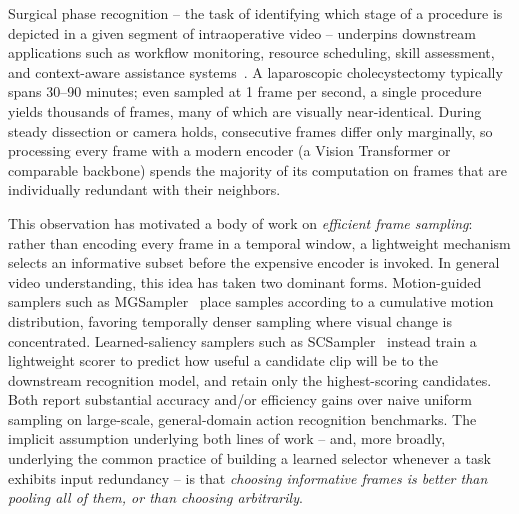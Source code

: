 \documentclass[preprint,12pt]{elsarticle}
\begin{document}
Surgical phase recognition -- the task of identifying which stage of a procedure is depicted in a given segment of intraoperative video -- underpins downstream applications such as workflow monitoring, resource scheduling, skill assessment, and context-aware assistance systems~\cite{czempiel2020tecno}. A laparoscopic cholecystectomy typically spans 30--90 minutes; even sampled at 1 frame per second, a single procedure yields thousands of frames, many of which are visually near-identical. During steady dissection or camera holds, consecutive frames differ only marginally, so processing every frame with a modern encoder (a Vision Transformer or comparable backbone) spends the majority of its computation on frames that are individually redundant with their neighbors.

This observation has motivated a body of work on \emph{efficient frame sampling}: rather than encoding every frame in a temporal window, a lightweight mechanism selects an informative subset before the expensive encoder is invoked. In general video understanding, this idea has taken two dominant forms. Motion-guided samplers such as MGSampler~\cite{zhi2021mgsampler} place samples according to a cumulative motion distribution, favoring temporally denser sampling where visual change is concentrated. Learned-saliency samplers such as SCSampler~\cite{korbar2019scsampler} instead train a lightweight scorer to predict how useful a candidate clip will be to the downstream recognition model, and retain only the highest-scoring candidates. Both report substantial accuracy and/or efficiency gains over naive uniform sampling on large-scale, general-domain action recognition benchmarks. The implicit assumption underlying both lines of work -- and, more broadly, underlying the common practice of building a learned selector whenever a task exhibits input redundancy -- is that \emph{choosing informative frames is better than pooling all of them, or than choosing arbitrarily}.
\end{document}
